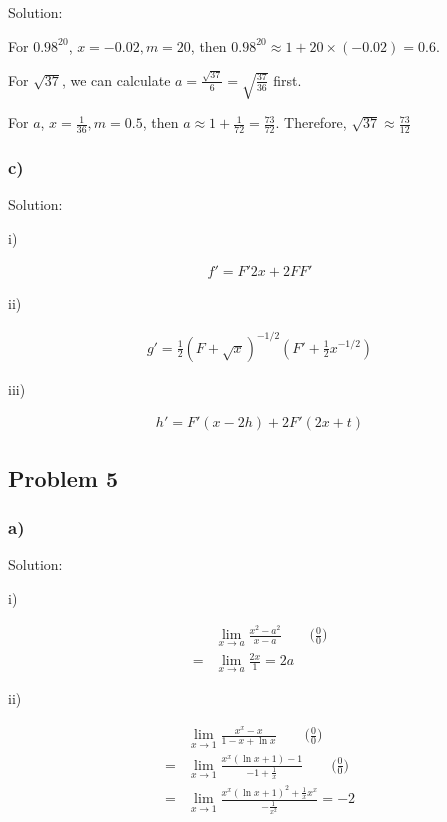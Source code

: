 \documentclass[letterpaper, 11pt]{article}
\newcommand{\1}{\mathds{1}}	%
\theoremstyle{definition}
\begin{document}
  Solution:

  For $0.98 ^{20}$, $ x = -0.02, m = 20$, then $0.98 ^{20} \approx 1 + 20 \times (-0.02) = 0.6 $.

  For $\sqrt{37}$, we can calculate $a = \frac{\sqrt{37}}{6} = \sqrt{\frac{37}{36}}$ first.

  For $a$, $x = \frac{1}{36}, m = 0.5$, then $a \approx 1 + \frac{1}{72} = \frac{73}{72}$. Therefore, $\sqrt{37} \approx \frac{73}{12}$

  \subsubsection*{c)}

  Solution:

  i)

  \begin{align*}
    f' = F'2x + 2FF'
  \end{align*}

  ii)

  \begin{align*}
    g' = \frac{1}{2} (F + \sqrt{x})^{-1/2} (F' + \frac{1}{2}x ^{-1/2})
  \end{align*}

  iii)

  \begin{align*}
    h' = F'(x-2h) + 2F'(2x+t)
  \end{align*}


  \subsection*{Problem 5}

  \subsubsection*{a)}

  Solution:

  i)

  \begin{align*}
      & \lim_{x \to a} \frac{x ^{2} - a ^{2}}{ x - a} \qquad\text{($\frac{0}{0}$)} \\
    = & \lim_{x \to a} \frac{2x}{1} = 2a
  \end{align*}

  ii)

  \begin{align*}
      & \lim_{x \to 1} \frac{x ^{x} -x}{1-x + \ln x} \qquad\text{($\frac{0}{0}$)}                \\
    = & \lim_{x \to 1} \frac{x ^{x}(\ln x + 1) - 1}{-1+\frac{1}{x}}\qquad\text{($\frac{0}{0}$)}  \\
    = & \lim_{x \to 1} \frac{x ^{x}(\ln x + 1)^{2} + \frac{1}{x}x ^{x}}{- \frac{1}{x ^{2}}} = -2
  \end{align*}
\end{document}
